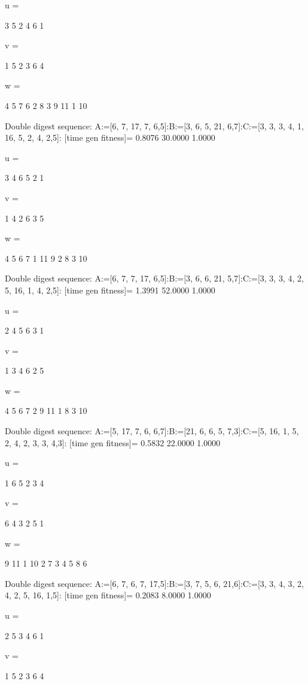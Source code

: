 u =

     3     5     2     4     6     1


v =

     1     5     2     3     6     4


w =

     4     5     7     6     2     8     3     9    11     1    10

Double digest sequence:
A:=[6, 7, 17, 7, 6,5]:B:=[3, 6, 5, 21, 6,7]:C:=[3, 3, 3, 4, 1, 16, 5, 2, 4, 2,5]:
[time gen fitness]=
    0.8076   30.0000    1.0000


u =

     3     4     6     5     2     1


v =

     1     4     2     6     3     5


w =

     4     5     6     7     1    11     9     2     8     3    10

Double digest sequence:
A:=[6, 7, 7, 17, 6,5]:B:=[3, 6, 6, 21, 5,7]:C:=[3, 3, 3, 4, 2, 5, 16, 1, 4, 2,5]:
[time gen fitness]=
    1.3991   52.0000    1.0000


u =

     2     4     5     6     3     1


v =

     1     3     4     6     2     5


w =

     4     5     6     7     2     9    11     1     8     3    10

Double digest sequence:
A:=[5, 17, 7, 6, 6,7]:B:=[21, 6, 6, 5, 7,3]:C:=[5, 16, 1, 5, 2, 4, 2, 3, 3, 4,3]:
[time gen fitness]=
    0.5832   22.0000    1.0000


u =

     1     6     5     2     3     4


v =

     6     4     3     2     5     1


w =

     9    11     1    10     2     7     3     4     5     8     6

Double digest sequence:
A:=[6, 7, 6, 7, 17,5]:B:=[3, 7, 5, 6, 21,6]:C:=[3, 3, 4, 3, 2, 4, 2, 5, 16, 1,5]:
[time gen fitness]=
    0.2083    8.0000    1.0000


u =

     2     5     3     4     6     1


v =

     1     5     2     3     6     4


